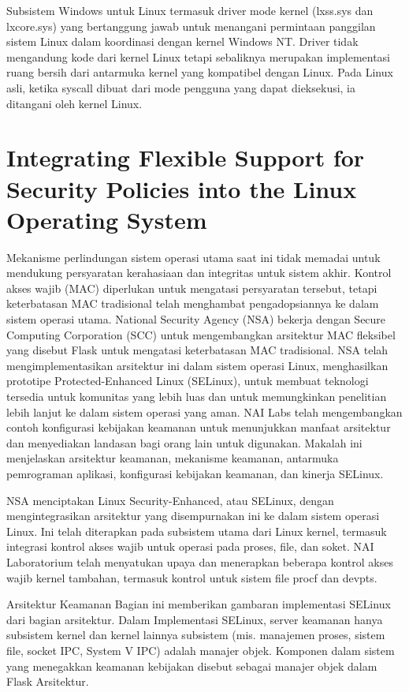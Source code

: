 \begin{enumeratae}
Subsistem Windows untuk Linux termasuk driver mode kernel (lxss.sys dan lxcore.sys) yang bertanggung jawab untuk menangani permintaan panggilan sistem Linux dalam koordinasi dengan kernel Windows NT. Driver tidak mengandung kode dari kernel Linux tetapi sebaliknya merupakan implementasi ruang bersih dari antarmuka kernel yang kompatibel dengan Linux. Pada Linux asli, ketika syscall dibuat dari mode pengguna yang dapat dieksekusi, ia ditangani oleh kernel Linux. 

\section{Integrating Flexible Support for Security Policies into the Linux Operating System}
Mekanisme perlindungan sistem operasi utama saat ini tidak memadai untuk mendukung persyaratan kerahasiaan dan integritas untuk sistem akhir. Kontrol akses wajib (MAC) diperlukan untuk mengatasi persyaratan tersebut, tetapi keterbatasan MAC tradisional telah menghambat pengadopsiannya ke dalam sistem operasi utama. National Security Agency (NSA) bekerja dengan Secure Computing Corporation (SCC) untuk mengembangkan arsitektur MAC fleksibel yang disebut Flask untuk mengatasi keterbatasan MAC tradisional. NSA telah mengimplementasikan arsitektur ini dalam sistem operasi Linux, menghasilkan prototipe Protected-Enhanced Linux (SELinux), untuk membuat teknologi tersedia untuk komunitas yang lebih luas dan untuk memungkinkan penelitian lebih lanjut ke dalam sistem operasi yang aman. NAI Labs telah mengembangkan contoh konfigurasi kebijakan keamanan untuk menunjukkan manfaat arsitektur dan menyediakan landasan bagi orang lain untuk digunakan. Makalah ini menjelaskan arsitektur keamanan, mekanisme keamanan, antarmuka pemrograman aplikasi, konfigurasi kebijakan keamanan, dan kinerja SELinux.

NSA menciptakan Linux Security-Enhanced, atau SELinux, dengan mengintegrasikan arsitektur yang disempurnakan ini ke dalam sistem operasi Linux. Ini telah diterapkan pada subsistem utama dari Linux kernel, termasuk integrasi kontrol akses wajib untuk operasi pada proses, file, dan soket. NAI Laboratorium telah menyatukan upaya dan menerapkan beberapa kontrol akses wajib kernel tambahan, termasuk kontrol untuk sistem file procf dan devpts.

Arsitektur Keamanan
Bagian ini memberikan gambaran implementasi SELinux dari bagian arsitektur. Dalam Implementasi SELinux, server keamanan hanya subsistem kernel dan kernel lainnya subsistem (mis. manajemen proses, sistem file, socket IPC, System V IPC) adalah manajer objek. Komponen dalam sistem yang menegakkan keamanan kebijakan disebut sebagai manajer objek dalam Flask Arsitektur.



\end{enumeratae}
